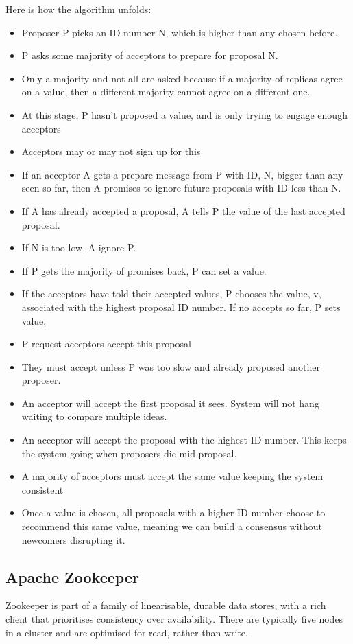 \documentclass[11pt,a4paper,titlepage,dvipsnames,cmyk]{scrartcl}
\begin{document}
Here is how the algorithm unfolds:
\begin{itemize}
    \item Proposer P picks an ID number N, which is higher than any chosen before.
    \item P asks some majority of acceptors to prepare for proposal N.
    \item Only a majority and not all are asked because if a majority of replicas agree on a value, then a different majority cannot agree on a different one.
    \item At this stage, P hasn't proposed a value, and is only trying to engage enough acceptors
    \item Acceptors may or may not sign up for this
    \item If an acceptor A gets a prepare message from P with ID, N, bigger than any seen so far, then A promises to ignore future proposals with ID less than N.
    \item If A has already accepted a proposal, A tells P the value of the last accepted proposal.
    \item If N is too low, A ignore P.
    \item If P gets the majority of promises back, P can set a value.
    \item If the acceptors have told their accepted values, P chooses the value, v, associated with the highest proposal ID number. If no accepts so far, P sets value.
    \item P request acceptors accept this proposal
    \item They must accept unless P was too slow and already proposed another proposer.
    \item An acceptor will accept the first proposal it sees. System will not hang waiting to compare multiple ideas.
    \item An acceptor will accept the proposal with the highest ID number. This keeps the system going when proposers die mid proposal.
    \item A majority of acceptors must accept the same value keeping the system consistent
    \item Once a value is chosen, all proposals with a higher ID number choose to recommend this same value, meaning we can build a consensus without newcomers disrupting it.
\end{itemize}

\subsection{Apache Zookeeper}
Zookeeper is part of a family of linearisable, durable data stores, with a rich client that prioritises consistency over availability. There are typically five nodes in a cluster and are optimised for read, rather than write.
\end{document}
